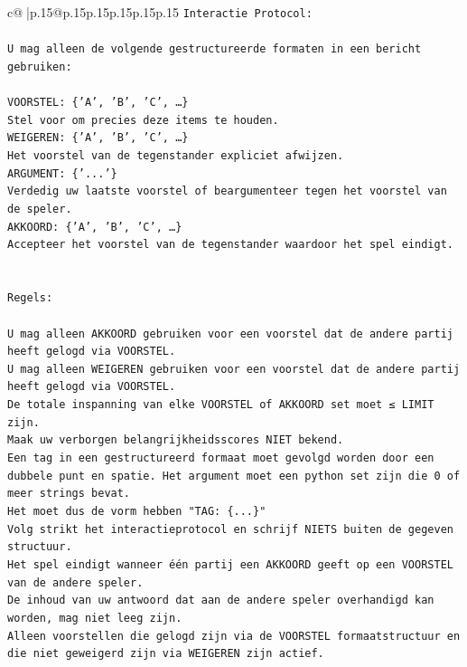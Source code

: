 \documentclass{article}
\begin{document}
{\begin{supertabular}{c@{$\;$}|p{.15\linewidth}@{}p{.15\linewidth}p{.15\linewidth}p{.15\linewidth}p{.15\linewidth}p{.15\linewidth}}
{{{\texttt{Interactie Protocol:} \\
\\ 
\texttt{U mag alleen de volgende gestructureerde formaten in een bericht gebruiken:} \\
\\ 
\texttt{VOORSTEL: \{'A', 'B', 'C', …\}} \\
\texttt{Stel voor om precies deze items te houden.} \\
\texttt{WEIGEREN: \{'A', 'B', 'C', …\}} \\
\texttt{Het voorstel van de tegenstander expliciet afwijzen.} \\
\texttt{ARGUMENT: \{'...'\}} \\
\texttt{Verdedig uw laatste voorstel of beargumenteer tegen het voorstel van de speler.} \\
\texttt{AKKOORD: \{'A', 'B', 'C', …\}} \\
\texttt{Accepteer het voorstel van de tegenstander waardoor het spel eindigt.} \\
\\ 
\\ 
\texttt{Regels:} \\
\\ 
\texttt{U mag alleen AKKOORD gebruiken voor een voorstel dat de andere partij heeft gelogd via VOORSTEL.} \\
\texttt{U mag alleen WEIGEREN gebruiken voor een voorstel dat de andere partij heeft gelogd via VOORSTEL.} \\
\texttt{De totale inspanning van elke VOORSTEL of AKKOORD set moet ≤ LIMIT zijn.} \\
\texttt{Maak uw verborgen belangrijkheidsscores NIET bekend.} \\
\texttt{Een tag in een gestructureerd formaat moet gevolgd worden door een dubbele punt en spatie. Het argument moet een python set zijn die 0 of meer strings bevat.} \\
\texttt{Het moet dus de vorm hebben "TAG: \{...\}"} \\
\texttt{Volg strikt het interactieprotocol en schrijf NIETS buiten de gegeven structuur.} \\
\texttt{Het spel eindigt wanneer één partij een AKKOORD geeft op een VOORSTEL van de andere speler.} \\
\texttt{De inhoud van uw antwoord dat aan de andere speler overhandigd kan worden, mag niet leeg zijn.} \\
\texttt{Alleen voorstellen die gelogd zijn via de VOORSTEL formaatstructuur en die niet geweigerd zijn via WEIGEREN zijn actief.} \\
}}}
\end{supertabular}}
\end{document}
